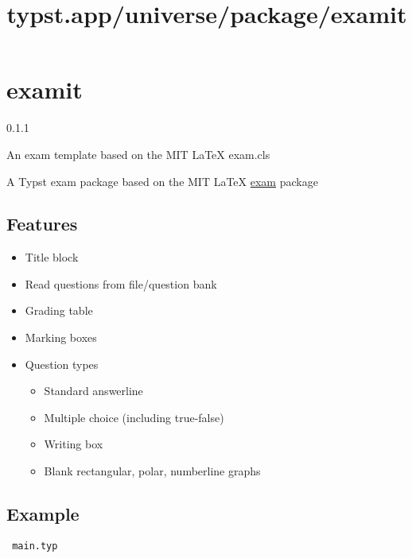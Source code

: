 \title{typst.app/universe/package/examit}

\label{banner}
\section{examit}\label{examit}

{ 0.1.1 }

An exam template based on the MIT LaTeX exam.cls

\label{readme}
A Typst exam package based on the MIT LaTeX
\href{https://ctan.org/pkg/exam}{exam} package

\subsection{Features}\label{features}

\begin{itemize}
\tightlist
\item
  Title block
\item
  Read questions from file/question bank
\item
  Grading table
\item
  Marking boxes
\item
  Question types

  \begin{itemize}
  \tightlist
  \item
    Standard answerline
  \item
    Multiple choice (including true-false)
  \item
    Writing box
  \item
    Blank rectangular, polar, numberline graphs
  \end{itemize}
\end{itemize}

\subsection{Example}\label{example}

\texttt{\ main.typ\ }

